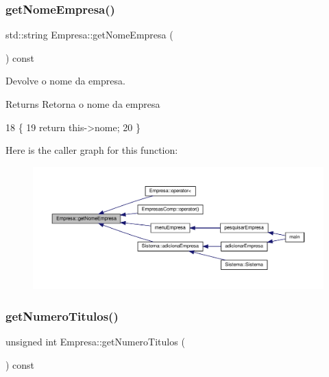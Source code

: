 \subsubsection{\texorpdfstring{get\+Nome\+Empresa()}{getNomeEmpresa()}}
{\footnotesize\ttfamily std\+::string Empresa\+::get\+Nome\+Empresa (\begin{DoxyParamCaption}{ }\end{DoxyParamCaption}) const}



Devolve o nome da empresa. 

\begin{DoxyReturn}{Returns}
Retorna o nome da empresa 
\end{DoxyReturn}

\begin{DoxyCode}
18                                        \{
19     \textcolor{keywordflow}{return} this->nome;
20 \}
\end{DoxyCode}
Here is the caller graph for this function\+:
\nopagebreak
\begin{figure}[H]
\begin{center}
\leavevmode
\includegraphics[width=350pt]{classEmpresa_a99bc2de98a0c0348abb74c93e6e7159e_icgraph}
\end{center}
\end{figure}
\mbox{\label{classEmpresa_a49b2b94a54bbc341822f64fc194f98fd}} 
\subsubsection{\texorpdfstring{get\+Numero\+Titulos()}{getNumeroTitulos()}}
{\footnotesize\ttfamily unsigned int Empresa\+::get\+Numero\+Titulos (\begin{DoxyParamCaption}{ }\end{DoxyParamCaption}) const}



